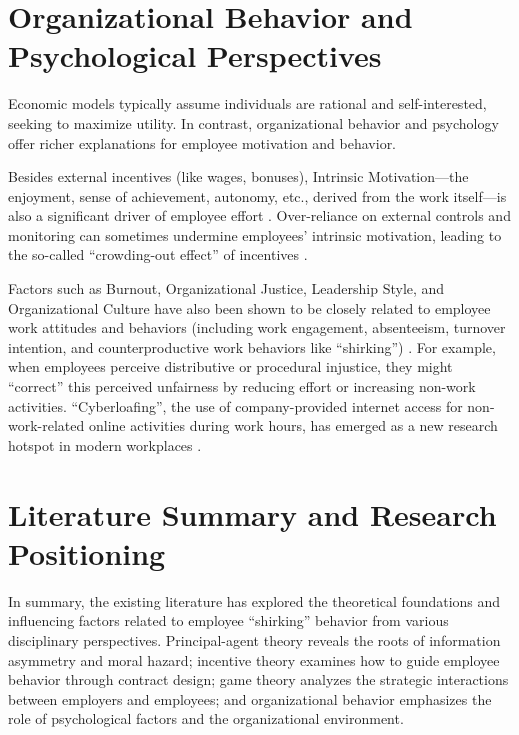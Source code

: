 \section{Organizational Behavior and Psychological Perspectives}

Economic models typically assume individuals are rational and self-interested, seeking to maximize utility. In contrast, organizational behavior and psychology offer richer explanations for employee motivation and behavior.

Besides external incentives (like wages, bonuses), Intrinsic Motivation—the enjoyment, sense of achievement, autonomy, etc., derived from the work itself—is also a significant driver of employee effort \citep{deci1985intrinsic}. Over-reliance on external controls and monitoring can sometimes undermine employees' intrinsic motivation, leading to the so-called \enquote{crowding-out effect} of incentives \citep{frey1997not}.

Factors such as Burnout, Organizational Justice, Leadership Style, and Organizational Culture have also been shown to be closely related to employee work attitudes and behaviors (including work engagement, absenteeism, turnover intention, and counterproductive work behaviors like \enquote{shirking}) \citep{maslach2001job, colquitt2001organizational}. For example, when employees perceive distributive or procedural injustice, they might \enquote{correct} this perceived unfairness by reducing effort or increasing non-work activities. \enquote{Cyberloafing}, the use of company-provided internet access for non-work-related online activities during work hours, has emerged as a new research hotspot in modern workplaces \citep{lim2002it}.

\section{Literature Summary and Research Positioning}

In summary, the existing literature has explored the theoretical foundations and influencing factors related to employee \enquote{shirking} behavior from various disciplinary perspectives. Principal-agent theory reveals the roots of information asymmetry and moral hazard; incentive theory examines how to guide employee behavior through contract design; game theory analyzes the strategic interactions between employers and employees; and organizational behavior emphasizes the role of psychological factors and the organizational environment.

